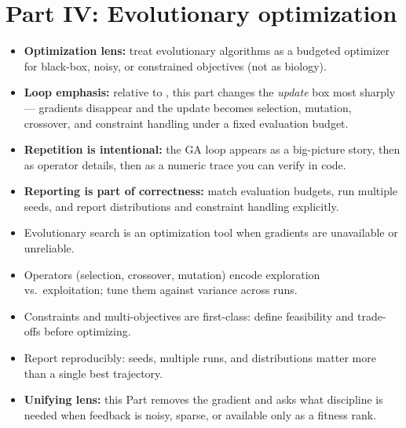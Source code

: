 \part*{Part IV: Evolutionary optimization}
\begin{tcolorbox}[summarybox, title={How to read Part IV (rolling window)}]
\begin{itemize}
  \item \textbf{Optimization lens:} treat evolutionary algorithms as a budgeted optimizer for black-box, noisy, or constrained objectives (not as biology).
  \item \textbf{Loop emphasis:} relative to , this part changes the \emph{update} box most sharply --- gradients disappear and the update becomes selection, mutation, crossover, and constraint handling under a fixed evaluation budget.
  \item \textbf{Repetition is intentional:} the GA loop appears as a big-picture story, then as operator details, then as a numeric trace you can verify in code.
  \item \textbf{Reporting is part of correctness:} match evaluation budgets, run multiple seeds, and report distributions and constraint handling explicitly.
\end{itemize}
\end{tcolorbox}

\begin{tcolorbox}[summarybox, title={Part IV takeaways}]
\begin{itemize}
  \item Evolutionary search is an optimization tool when gradients are unavailable or unreliable.
  \item Operators (selection, crossover, mutation) encode exploration vs.\ exploitation; tune them against variance across runs.
  \item Constraints and multi-objectives are first-class: define feasibility and trade-offs before optimizing.
  \item Report reproducibly: seeds, multiple runs, and distributions matter more than a single best trajectory.
  \item \textbf{Unifying lens:} this Part removes the gradient and asks what discipline is needed when feedback is noisy, sparse, or available only as a fitness rank.
\end{itemize}
\end{tcolorbox}

